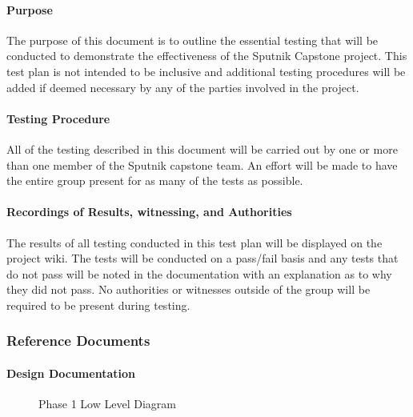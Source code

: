 \documentclass[]{article}
\let\oldparagraph\paragraph
\renewcommand{\paragraph}[1]{\oldparagraph{#1}\mbox{}}
\begin{document}
\paragraph{Purpose}\label{purpose}

The purpose of this document is to outline the essential testing that
will be conducted to demonstrate the effectiveness of the Sputnik
Capstone project. This test plan is not intended to be inclusive and
additional testing procedures will be added if deemed necessary by any
of the parties involved in the project.

\paragraph{Testing Procedure}\label{testing-procedure}

All of the testing described in this document will be carried out by one
or more than one member of the Sputnik capstone team. An effort will be
made to have the entire group present for as many of the tests as
possible.

\paragraph{Recordings of Results, witnessing, and
Authorities}\label{recordings-of-results-witnessing-and-authorities}

The results of all testing conducted in this test plan will be displayed
on the project wiki. The tests will be conducted on a pass/fail basis
and any tests that do not pass will be noted in the documentation with
an explanation as to why they did not pass. No authorities or witnesses
outside of the group will be required to be present during testing.

\subsubsection{Reference Documents}\label{reference-documents}

\paragraph{Design Documentation}\label{design-documentation}

\begin{figure}[htbp]
\centering
\caption{Phase 1 Low Level Diagram}
\end{figure}
\end{document}
